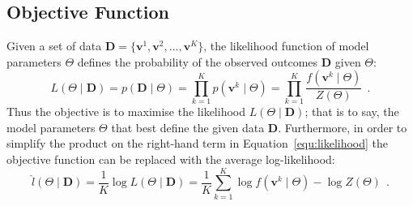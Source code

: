 \subsection{Objective Function}
Given a set of data $ \mathbf{D}=\{\mathbf{v}^1, \mathbf{v}^2, ..., \mathbf{v}^K\} $, the likelihood function of model parameters $\Theta$ defines the probability of the observed outcomes $ \mathbf{D}$ given $\Theta$:
\begin{equation}
L (\Theta \mid \mathbf{D}) = p(\mathbf{D} \mid \Theta ) = \prod_{k=1}^K p(\mathbf{v}^k \mid \Theta ) =  \prod_{k=1}^K\dfrac{f(\mathbf{v}^k \mid \Theta )}{Z( \Theta)}~~.
\label{equ:likelihood}
\end{equation}
Thus the objective is to maximise the likelihood $L (\Theta \mid \mathbf{D})$; that is to say, the model parameters $ \Theta $ that best define the given data $\mathbf{D}$.
Furthermore, in order to simplify the product on the right-hand term in Equation~\ref{equ:likelihood} the objective function can be replaced with the average log-likelihood:
\begin{equation}
\label{equ:like}
\hat{l} (\Theta \mid \mathbf{D}) =\frac{1}{K}\log  L (\Theta \mid \mathbf{D}) 
=\frac{1}{K}\sum_{k=1}^K\log f(\mathbf{v}^k \mid \Theta ) - \log Z( \Theta)~~.
\end{equation}

%
%


%


